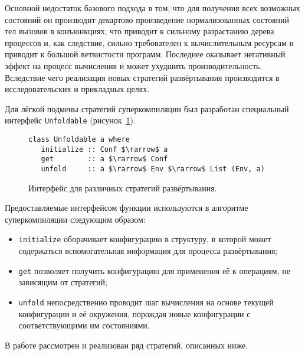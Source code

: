 Основной недостаток базового подхода в том, что для получения всех возможных
состояний он производит декартово произведение нормализованных состояний тел
вызовов в конъюнкциях, что приводит к сильному разрастанию дерева процессов и,
как следствие, сильно требователен к вычислительным ресурсам и приводит
к большой ветвистости программ. Последнее оказывает негативный эффект на процесс
вычисления и может ухудшить производительность.
Вследствие чего реализация новых стратегий развёртывания производится
в исследовательских и прикладных целях.

Для лёгкой подмены стратегий суперкомпиляции был разработан специальный интерфейс \lstinline{Unfoldable}
(рисунок~\ref{fig:unfoldable}).
\begin{figure}[h!]
\begin{lstlisting}
class Unfoldable a where
   initialize :: Conf $\rarrow$ a
   get        :: a $\rarrow$ Conf
   unfold     :: a $\rarrow$ Env $\rarrow$ List (Env, a)
\end{lstlisting}
\caption{Интерфейс для различных стратегий развёртывания.}
\label{fig:unfoldable}
\end{figure}

Предоставляемые интерфейсом функции используются в алгоритме суперкомпиляции следующим образом:
\begin{itemize}
\item \lstinline{initialize} оборачивает конфигурацию в структуру, в которой может содержаться
      вспомогательная информация для процесса развёртывания;
\item \lstinline{get} позволяет получить конфигурацию для применения её к операциям, не зависящим
      от стратегий;
\item \lstinline{unfold} непосредственно проводит шаг вычисления на основе текущей конфигурации
      и её окружения, порождая новые конфигурации с соответствующими им состояниями.
\end{itemize}

В работе рассмотрен и реализован ряд стратегий, описанных ниже.

